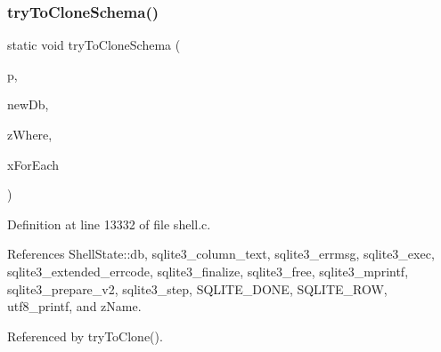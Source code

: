 \subsubsection{try\+To\+Clone\+Schema()}
{\footnotesize\ttfamily static void try\+To\+Clone\+Schema (\begin{DoxyParamCaption}\item[{\textbf{ Shell\+State} $\ast$}]{p,  }\item[{\textbf{ sqlite3} $\ast$}]{new\+Db,  }\item[{const char $\ast$}]{z\+Where,  }\item[{void($\ast$)(\textbf{ Shell\+State} $\ast$, \textbf{ sqlite3} $\ast$, const char $\ast$)}]{x\+For\+Each }\end{DoxyParamCaption})\hspace{0.3cm}{\ttfamily [static]}}



Definition at line 13332 of file shell.\+c.



References Shell\+State\+::db, sqlite3\+\_\+column\+\_\+text, sqlite3\+\_\+errmsg, sqlite3\+\_\+exec, sqlite3\+\_\+extended\+\_\+errcode, sqlite3\+\_\+finalize, sqlite3\+\_\+free, sqlite3\+\_\+mprintf, sqlite3\+\_\+prepare\+\_\+v2, sqlite3\+\_\+step, S\+Q\+L\+I\+T\+E\+\_\+\+D\+O\+NE, S\+Q\+L\+I\+T\+E\+\_\+\+R\+OW, utf8\+\_\+printf, and z\+Name.



Referenced by try\+To\+Clone().



